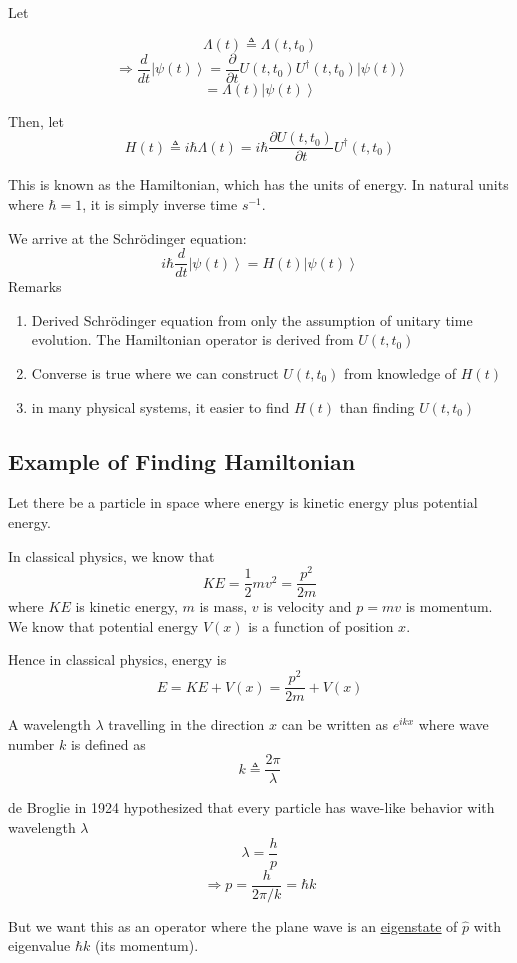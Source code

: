 \documentclass[
]{article}
\providecommand{\tightlist}{%
  \setlength{\itemsep}{0pt}\setlength{\parskip}{0pt}}
\let\oldhyperref\hyperref
\renewcommand{\hyperref}[2][]{\oldhyperref[#1]{\underline{#2}}}
\providecommand{\ket}[1]{\left\lvert #1 \right\rangle}
\providecommand{\Rarr}{\Rightarrow}
\begin{document}
Let

\[
	\Lambda (t)\triangleq \Lambda (t,t_0)
\]
\[
	\Rarr \frac{d}{dt}\ket{\psi(t)} = \frac{\partial}{\partial t}U(t, t_0)U^\dag(t,t_0) |\psi(t)\rangle
\]
\[
	=\Lambda (t)\ket{\psi(t)}
\]

Then, let
\[
	\boxed{H(t)\triangleq i\hbar \Lambda (t) = i\hbar \frac{\partial U(t, t_0)}{\partial t} U^\dagger(t, t_0)}
\]

This is known as the Hamiltonian, which has the units of energy. In natural units where $\hbar=1$, it is simply inverse time $s^{-1}$.

We arrive at the Schrödinger equation:
\[
	\boxed{i\hbar \frac{d}{dt}\ket{\psi(t)}=H(t)\ket{\psi(t)}}
\]
Remarks

\begin{enumerate}
	\tightlist
	\item Derived Schrödinger equation from only the assumption of unitary time evolution. The Hamiltonian operator is derived from $U(t,t_0)$
	\item Converse is true where we can construct $U(t,t_0)$ from knowledge of $H(t)$
	\item in many physical systems, it easier to find $H(t)$ than finding $U(t,t_0)$
\end{enumerate}

\subsection{Example of Finding Hamiltonian}\label{example-of-finding-hamiltonian}

Let there be a particle in space where energy is kinetic energy plus potential energy.

In classical physics, we know that
\[
	KE = \frac{1}{2}mv^2 = \frac{p^2}{2m}
\]
where $KE$ is kinetic energy, $m$ is mass, $v$ is velocity and $p=mv$ is momentum.
We know that potential energy $V(x)$ is a function of position $x$.

Hence in classical physics, energy is
\[
	E=KE+V(x)=\frac{p^2}{2m}+V(x)
\]

A wavelength $\lambda$ travelling in the direction $x$ can be written as $e^{ikx}$ where wave number $k$ is defined as
\[
	k\triangleq \frac{2\pi}{\lambda}
\]

de Broglie in 1924 hypothesized that every particle has wave-like behavior with wavelength $\lambda$
\[
	\lambda = \frac{h}{p}
\]
\[
	\Rarr p=\frac{h}{2\pi/k}=\hbar k
\]

But we want this as an operator where the plane wave is an \hyperref[eigenstates]{eigenstate} of \(\hat{p}\) with eigenvalue $\hbar k$ (its momentum).
\end{document}

